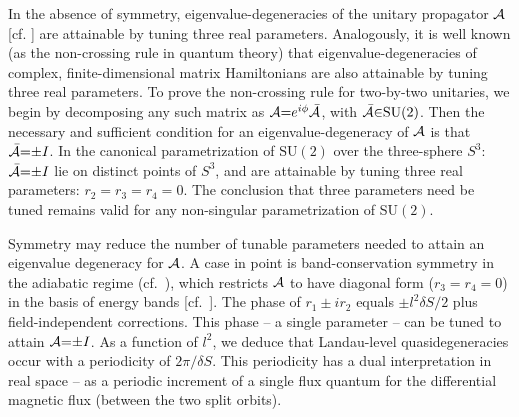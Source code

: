 \documentclass[aps, prb, showpacs, twocolumn, notitlepage, superscriptaddress]{revtex4-1}
\begin{document}
In the absence of symmetry, eigenvalue-degeneracies of the unitary propagator ${\cal A}$ [cf. ] are attainable by tuning three real parameters. Analogously, it is well known (as the non-crossing rule in quantum theory\cite{neumann2000behaviour}) that eigenvalue-degeneracies of complex, finite-dimensional matrix Hamiltonians are also attainable by tuning three real parameters.
 To prove the non-crossing rule for two-by-two unitaries, we begin by decomposing any such matrix as ${\cal A}{=}e^{i\phi}{\cal \bar{A}}$, with  ${\cal \bar{A}}{\in}\text{SU}(2)$. Then the necessary and sufficient condition for an eigenvalue-degeneracy of ${\cal A}$ is that ${\cal \bar{A}}{=}{\pm}I$. In the canonical parametrization of $\text{SU}(2)$ over the three-sphere $S^3$: 
${\cal \bar{A}}{=}{\pm}I$ lie on distinct points of $S^3$, and are attainable by tuning three real parameters: $r_2{=}r_3{=}r_4{=}0$. The conclusion that three parameters need be tuned remains valid for any  non-singular parametrization of SU$(2)$.


 
Symmetry may reduce the number of tunable parameters needed to attain an eigenvalue degeneracy for ${\cal A}$. A case in point is band-conservation symmetry in the adiabatic regime (cf.\ ), which restricts ${\cal A}$ to have diagonal form  ($r_3{=}r_4{=}0$) in the basis of energy bands [cf.\ ]. The phase of $r_1{\pm}ir_2$ equals ${\pm} l^2\delta S/2$ plus field-independent corrections. This  phase -- a single parameter --  can be  tuned to attain ${\cal A}{=}{\pm}I$. As a function of $l^2$, we deduce that Landau-level quasidegeneracies occur  with a periodicity of $2\pi/\delta S$. This periodicity  has a dual interpretation  in real space -- as a periodic increment of a single flux quantum for  the differential magnetic flux (between the two split orbits).
\end{document}

